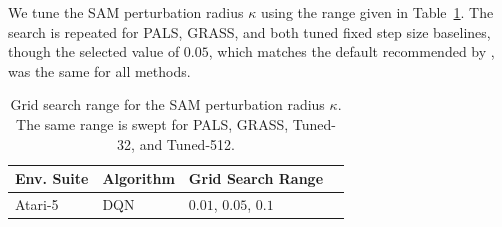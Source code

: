\FloatBarrier
We tune the SAM perturbation radius $\kappa$ using the range given in Table~\ref{tab:sam_tuning_range}. The search is repeated for PALS, GRASS, and both tuned fixed step size baselines, though the selected value of $0.05$, which matches the default recommended by , was the same for all methods.

\begin{table}[htbp]
\centering
\small
\setlength{\tabcolsep}{6pt}
\renewcommand{\arraystretch}{1.2}
\begin{tabular}{@{}l l l l@{}}
\toprule
Env. Suite & Algorithm & Grid Search Range \\
\midrule
Atari-5 & DQN & $0.01$, $\mathbf{0.05}$, $0.1$ \\
\bottomrule
\end{tabular}
\caption[Grid search range for the SAM perturbation radius $\kappa$.]{Grid search range for the SAM perturbation radius $\kappa$. The same range is swept for PALS, GRASS, Tuned-32, and Tuned-512.}
\label{tab:sam_tuning_range}
\end{table}

